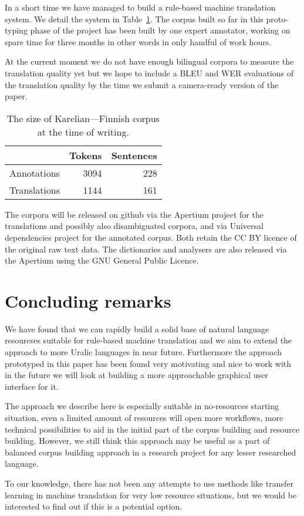 \documentclass[11pt]{article}
\begin{document}
In a short time we have managed to build a rule-based machine translation
system. We detail the system in Table~\ref{table:sizes}. The corpus built
so far in this proto-typing phase of the project has been built by one
expert annotator, working on spare time for three months in other words in
only handful of work hours.

At the current moment we do not have enough bilingual corpora to measure the
translation quality yet but we hope to include a BLEU and WER evaluations of
the translation quality by the time we submit a camera-ready version of the
paper.

\begin{table}
    \begin{tabular}{lrr}
        \toprule
         & Tokens & Sentences \\
        \midrule
        Annotations & 3094 & 228 \\
        Translations & 1144 & 161 \\
        \bottomrule
    \end{tabular}
    \caption{The size of Karelian---Finnish corpus at the time of
    writing.\label{table:sizes}}
\end{table}

The corpora will be released on github via the Apertium project for the
translations and possibly also disambiguated corpora, and via Universal
dependencies project for the annotated corpus. Both retain the CC BY
licence of the original raw text data. The dictionaries and analysers
are also released via the Apertium using the GNU General Public Licence.

\section{Concluding remarks}
\label{sec:conclusion}

We have found that we can rapidly build a solid base of natural language
resourcses suitable for rule-based machine translation and we aim to extend the
approach to more Uralic languages in near future. Furthermore the approach
prototyped in this paper has been found very motivating and nice to work with
in the future we will look at building a more approachable graphical user
interface for it.

The approach we describe here is especially suitable in no-resources starting
situation, even a limited amount of resources will open more workflows, more
technical possibilities to aid in the initial part of the corpus building and
resource building. However, we still think this approach may be useful as a
part of balanced corpus building approach in a research project for any lesser
researched language.

To our knowledge, there has not been any attempts to use methods like transfer
learning in machine translation for very low resource situations, but we
would be interested to find out if this is a potential option.



\end{document}
